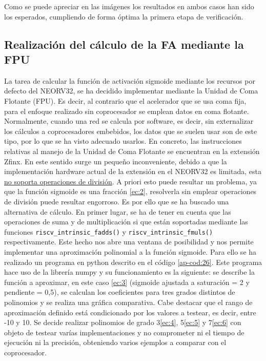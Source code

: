 Como se puede apreciar en las imágenes los resultados en ambos casos han sido los esperados, cumpliendo de forma óptima la primera etapa de verificación.

\subsection{Realización del cálculo de la FA mediante la FPU}

\label{fpu-fa}

La tarea de calcular la función de activación sigmoide mediante los recursos por defecto del NEORV32, se ha decidido implementar mediante la Unidad de Coma Flotante (FPU).
Es decir, al contrario que el acelerador que se usa coma fija, para el enfoque realizado sin coprocesador se emplean datos en coma flotante.
Normalmente, cuando una red se calcula por software, es decir, sin externalizar los cálculos a coprocesadores embebidos, los datos que se suelen usar son de este tipo, por lo que se ha visto adecuado usarlos.
En concreto, las instrucciones relativas al manejo de la Unidad de Coma Flotante se encuentran en la extensión Zfinx.
En este sentido surge un pequeño inconveniente, debido a que la implementación hardware actual de la extensión en el NEORV32 es limitada, esta \href{https://stnolting.github.io/neorv32/#_zfinx_isa_extension}{no soporta operaciones de división}.
A priori esto puede resultar un problema, ya que la función sigmoide es una fracción \eqref{ec:2}, resolverla sin emplear operaciones de división puede resultar engorroso.
Es por ello que se ha buscado una alternativa de cálculo.
En primer lugar, se ha de tener en cuenta que las operaciones de suma y de multiplicación si que están soportadas mediante las funciones \texttt{riscv_intrinsic_fadds()} y \texttt{riscv_intrinsic_fmuls()} respectivamente.
Este hecho nos abre una ventana de posibilidad y nos permite implementar una aproximación polinomial a la función sigmoide.
Para ello se ha realizado un programa en python descrito en el código \ref{ap-cod:26}.
Este programa hace uso de la librería numpy y su funcionamiento es la siguiente: se describe la función a aproximar, en este caso \eqref{ec:3} (sigmoide ajustada a saturación = 2 y pendiente = 0,5), se calculan los coeficientes para tres grados distintos de polinomios y se realiza una gráfica comparativa.
Cabe destacar que el rango de aproximación definido está condicionado por los valores a testear, es decir, entre -10 y 10.
Se decide realizar polinomios de grado 3\eqref{ec:4}, 5\eqref{ec:5} y 7\eqref{ec:6} con objeto de testear varías implementaciones y no comprometer ni el tiempo de ejecución ni la precisión, obteniendo varios ejemplos a comparar con el coprocesador. 

